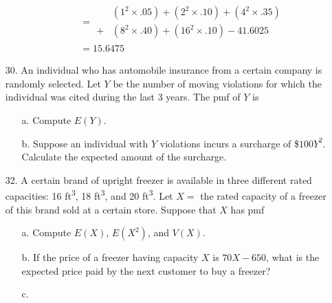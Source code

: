 \documentclass[letterpaper,12pt]{article}
\begin{document}
\begin{enumerate}
\begin{enumerate}
\begin{align*}
          &= \begin{aligned}
            &(1^2 \times .05) + (2^2 \times .10) + (4^2 \times .35) \\
            + &(8^2 \times .40) + (16^2 \times .10) - 41.6025
          \end{aligned} \\
          &= 15.6475
        \end{align*}
    \end{enumerate}
  \item[30.]
    An individual who has automobile insurance from a certain company is randomly selected. Let $Y$ be the number of moving violations for which the individual was cited during the last 3 years. The pmf of $Y$ is
    \begin{center}
    \end{center}
    \begin{enumerate}
      \item[a.]
        Compute $E(Y)$.
      \item[b.]
        Suppose an individual with $Y$ violations incurs a surcharge of \$$100Y^2$. Calculate the expected amount of the surcharge.
    \end{enumerate}
  \item[32.]
    A certain brand of upright freezer is available in three different rated capacities: 16 ft\textsuperscript{3}, 18 ft\textsuperscript{3}, and 20 ft\textsuperscript{3}. Let $X =$ the rated capacity of a freezer of this brand sold at a certain store. Suppose that $X$ has pmf
    \begin{center}
    \end{center}
    \begin{enumerate}
      \item[a.]
        Compute $E(X)$, $E(X^2)$, and $V(X)$.
      \item[b.]
        If the price of a freezer having capacity $X$ is $70X - 650$, what is the expected price paid by the next customer to buy a freezer?
      \item[c.]

\end{enumerate}
\end{enumerate}
\end{document}
